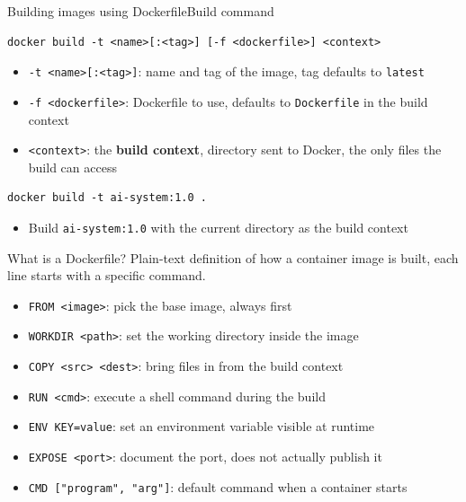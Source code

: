 \documentclass[aspectratio=169]{beamer}
\begin{document}
\begin{frame}[fragile]{Building images using Dockerfile}{Build command}
  \begin{verbatim}
docker build -t <name>[:<tag>] [-f <dockerfile>] <context>
  \end{verbatim}
  \begin{itemize}
    \item \texttt{-t <name>[:<tag>]}: name and tag of the image, tag defaults to \texttt{latest}
    \item \texttt{-f <dockerfile>}: Dockerfile to use, defaults to \texttt{Dockerfile} in the build context
    \item \texttt{<context>}: the \textbf{build context}, directory sent to Docker, the only files the build can access
  \end{itemize}

  \vspace{1em}

  \begin{verbatim}
docker build -t ai-system:1.0 .
  \end{verbatim}
  \begin{itemize}
    \item Build \texttt{ai-system:1.0} with the current directory as the build context
  \end{itemize}

\note{
}
\end{frame}


\begin{frame}{What is a Dockerfile?}
  Plain-text definition of how a container image is built, each line starts with a specific command.

  \begin{itemize}
      \item \texttt{FROM <image>}: pick the base image, always first
      \item \texttt{WORKDIR <path>}: set the working directory inside the image
      \item \texttt{COPY <src> <dest>}: bring files in from the build context
      \item \texttt{RUN <cmd>}: execute a shell command during the build
      \item \texttt{ENV KEY=value}: set an environment variable visible at runtime
      \item \texttt{EXPOSE <port>}: document the port, does not actually publish it
      \item \texttt{CMD ["program", "arg"]}: default command when a container starts
  \end{itemize}

\note{
}
\end{frame}
\end{document}
